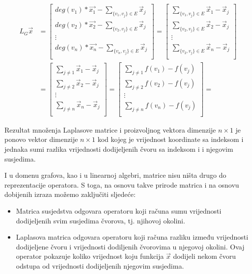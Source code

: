 \documentclass[11pt]{article}
\begin{document}
	\[
		\begin{split}
		L_G \vec{x} & =
		\begin{bmatrix}
			deg(v_1) * \vec{x_1} - \sum_{\{v_1,v_j\} \in E} \vec{x}_j \\
			deg(v_2) * \vec{x_2} - \sum_{\{v_2,v_j\} \in E} \vec{x}_j \\
			\vdots \\
			deg(v_n) * \vec{x_n} - \sum_{\{v_n,v_j\} \in E} \vec{x}_j \\
		\end{bmatrix} =
		\begin{bmatrix}
			\sum_{\{v_1,v_j\} \in E} \vec{x}_1-\vec{x}_j \\
			\sum_{\{v_2,v_j\} \in E} \vec{x}_2-\vec{x}_j \\
			\vdots \\
			\sum_{\{v_2,v_j\} \in E} \vec{x}_n-\vec{x}_j \\
		\end{bmatrix} \\
		& = 
		\begin{bmatrix}
			\sum_{ j \neq 1}  \vec{x}_1-\vec{x}_j \\
			\sum_{ j \neq 2}  \vec{x}_2-\vec{x}_j \\
			\vdots \\
			\sum_{ j \neq n}  \vec{x}_n-\vec{x}_j \\
		\end{bmatrix} =
		\begin{bmatrix}
			\sum_{ j \neq 1}  f(v_1) - f(v_j) \\
			\sum_{ j \neq 2}  f(v_2) - f(v_j) \\
			\vdots \\
			\sum_{ j \neq n}  f(v_n) - f(v_j) \\
		\end{bmatrix} =
		\end{split}
	\]

	Rezultat množenja Laplasove matrice i proizvoljnog vektora dimenzije $n \times 1$ je ponovo vektor dimenzije $n \times 1$
	kod kojeg je vrijednost koordinate sa indeksom i jednaka sumi razlika vrijednosti dodijeljenih čvoru sa indeksom i i njegovim susjedima.

	I u domenu grafova, kao i u linearnoj algebri, matrice nisu ništa drugo do reprezentacije operatora. 
	S toga, na osnovu takve prirode matrica i na osnovu dobijenih izraza možemo zaključiti sljedeće:
	\begin{itemize}
		\item Matrica susjedstva odgovara operatoru koji računa sumu vrijednosti dodijeljenih svim susjedima čvorova, tj. njihovoj okolini.
		\item Laplasova matrica odgovara operatoru koji računa razliku između vrijednosti dodijeljene čvoru i vrijednosti dodiljenih
		čvorovima u njegovoj okolini. 
		Ovaj operator pokazuje koliko vrijednost koju funkcija $\vec{x}$ dodijeli nekom čvoru odstupa od vrijednosti dodijeljenih njegovim susjedima.
	\end{itemize}
\end{document}
